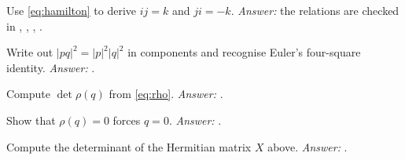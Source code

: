 \begin{exercise}
Use \eqref{eq:hamilton} to derive $ij=k$ and $ji=-k$. \emph{Answer:} the relations are checked in , , , .
\end{exercise}

\begin{exercise}
Write out $|pq|^2=|p|^2|q|^2$ in components and recognise Euler's four-square identity. \emph{Answer:} .
\end{exercise}

\begin{exercise}
Compute $\det\rho(q)$ from \eqref{eq:rho}. \emph{Answer:} .
\end{exercise}

\begin{exercise}
Show that $\rho(q)=0$ forces $q=0$. \emph{Answer:} .
\end{exercise}

\begin{exercise}
Compute the determinant of the Hermitian matrix $X$ above. \emph{Answer:} .
\end{exercise}
